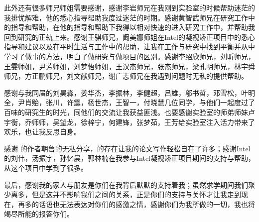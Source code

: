 \begin{ack}
此外还有很多师兄师姐需要感谢，感谢李岩师兄在我刚到实验室的时候帮助迷茫的我排忧解难，他的悉心指导帮助我度过迷茫的时期。感谢黄智武师兄在研究工作中的指导和帮助，在他的指导和帮助下我得以相对快速的进入研究工作中，并帮助我回到研究的正轨上来。感谢王骐师兄，阚美娜师姐在Intel的凝视矫正项目中的悉心指导和建议以及在平时生活与工作中的帮助，让我在工作与研究中找到平衡并从中学习了做事的方法，明白了做研究与做项目的区别。感谢李绍欣师兄，刘昕师兄，王雯师姐，尹芳师姐，刘梦怡师姐，王汉杰师兄，张杰师兄，梁孔明师兄，林宇舜师兄，方正鹏师兄，刘文献师兄，谢广志师兄在我遇到问题时无私的提供帮助。

感谢与我同届的刘昊淼，姜华杰，李振林，李健超，吕雄，邬书哲，邓雪松，叶明全，尹肖贻，张川，许震，杨世杰，王智一，付晓慧几位同学，与他们一起度过了百味的研究生的时光，同他们的交流让我获益匪浅。也要感谢实验室的师弟师妹卢宇衡，乔师师，吴望龙，徐梓宁，何建锋，张梦茹，王芳给实验室注入活力带来了欢乐，也让我反思自身。

感谢 \ucasthesis 的作者朝鲁的无私分享，\ucasthesis 的存在让我的论文写作轻松自在了许多；感谢Intel的刘伟，汤振宇，孙忆晨，郭林楠在我参与Intel凝视矫正项目期间的支持与帮助，从这个项目中学到了很多。

最后，感谢我的家人与朋友是你们在我背后默默的支持着我；虽然求学期间我们聚少离多，但是这并不影响我们之间的关系，正是你们的支持与关怀才让我走到现在，再多的话语也无法表达对你们的感激之情，感谢你们为我所做的一切，我也将竭尽所能的报答你们。
\end{ack}

